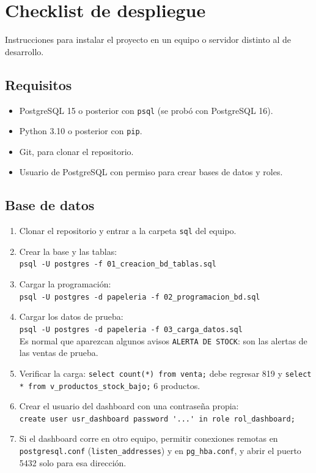 \documentclass[12pt,a4paper]{article}
\newcommand{\cod}[1]{{\ttfamily\nolinkurl{#1}}}
\begin{document}
\section{Checklist de despliegue}

Instrucciones para instalar el proyecto en un equipo o servidor distinto al de
desarrollo.

\subsection{Requisitos}

\begin{itemize}[label=$\square$, leftmargin=1.2cm, itemsep=0.2em]
\item PostgreSQL 15 o posterior con \cod{psql} (se probó con PostgreSQL 16).
\item Python 3.10 o posterior con \cod{pip}.
\item Git, para clonar el repositorio.
\item Usuario de PostgreSQL con permiso para crear bases de datos y roles.
\end{itemize}

\subsection{Base de datos}

\begin{enumerate}[label=$\square$ \arabic*., leftmargin=1.4cm, itemsep=0.35em]
\item Clonar el repositorio y entrar a la carpeta \cod{sql} del equipo.
\item Crear la base y las tablas:\\
\cod{psql -U postgres -f 01_creacion_bd_tablas.sql}
\item Cargar la programación:\\
\cod{psql -U postgres -d papeleria -f 02_programacion_bd.sql}
\item Cargar los datos de prueba:\\
\cod{psql -U postgres -d papeleria -f 03_carga_datos.sql}\\
Es normal que aparezcan algunos avisos \cod{ALERTA DE STOCK}: son las alertas de
las ventas de prueba.
\item Verificar la carga: \cod{select count(*) from venta;} debe regresar 819 y
\cod{select * from v_productos_stock_bajo;} 6 productos.
\item Crear el usuario del dashboard con una contraseña propia:\\
\cod{create user usr_dashboard password '...' in role rol_dashboard;}
\item Si el dashboard corre en otro equipo, permitir conexiones remotas en
\cod{postgresql.conf} (\cod{listen_addresses}) y en \cod{pg_hba.conf}, y abrir el
puerto 5432 solo para esa dirección.
\end{enumerate}
\end{document}
